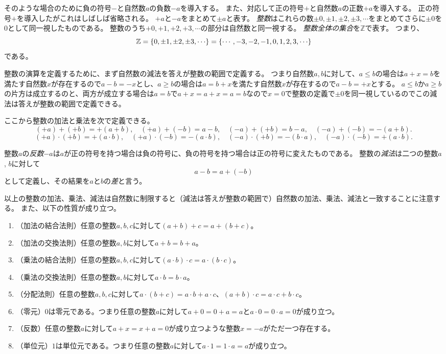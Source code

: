 そのような場合のために負の符号$-$と自然数$a$の負数$-a$を導入する。
また、対応して正の符号$+$と自然数$a$の正数$+a$を導入する。
正の符号$+$を導入したがこれはしばしば省略される。
$+a$と$-a$をまとめて$\pm a$と表す。
\emph{整数}はこれらの数$\pm 0, \pm 1, \pm 2, \pm 3, \cdots$をまとめてさらに$\pm 0$を$0$として同一視したものである。
整数のうち$+0, +1, +2, +3, \cdots$の部分は自然数と同一視する。
\emph{整数全体の集合}を$\mathbb{Z}$で表す。
つまり、
$$
\mathbb{Z} = \lrset{ 0, \pm 1, \pm 2, \pm 3, \cdots } = \lrset{ \cdots, -3, -2, -1, 0, 1, 2, 3, \cdots }
$$
である。

整数の演算を定義するために、まず自然数の減法を答えが整数の範囲で定義する。
つまり自然数$a, b$に対して、$a \le b$の場合は$a+x = b$を満たす自然数$x$が存在するので$a-b = -x$とし、$a \ge b$の場合は$a = b+x$を満たす自然数$x$が存在するので$a-b = +x$とする。
$a \le b$か$a \ge b$の片方は成立するのと、両方が成立する場合は$a = b$で$a+x = a+x = a = b$なので$x = 0$で整数の定義で$\pm 0$を同一視しているのでこの減法は答えが整数の範囲で定義できる。

ここから整数の加法と乗法を次で定義できる。
$$
(+a)+(+b) = +(a+b),
\quad (+a)+(-b) = a-b,
\quad (-a)+(+b) = b-a,
\quad (-a)+(-b) = -(a+b).
$$
$$
(+a)\cdot (+b) = +(a\cdot b),
\quad (+a)\cdot (-b) = -(a\cdot b),
\quad (-a)\cdot (+b) = -(b\cdot a),
\quad (-a)\cdot (-b) = +(a\cdot b).
$$

整数$a$の\emph{反数}$-a$は$a$が正の符号を持つ場合は負の符号に、負の符号を持つ場合は正の符号に変えたものである。
整数の\emph{減法}は二つの整数$a$, $b$に対して
$$
a-b = a+(-b)
$$
として定義し、その結果を$a$と$b$の\emph{差}と言う。

以上の整数の加法、乗法、減法は自然数に制限すると（減法は答えが整数の範囲で）自然数の加法、乗法、減法と一致することに注意する。
また、以下の性質が成り立つ。
\begin{enumerate}
\item
（加法の結合法則）任意の整数$a, b, c$に対して$(a+b)+c = a+(b+c)$。
\item
（加法の交換法則）任意の整数$a, b$に対して$a+b = b+a$。
\item
（乗法の結合法則）任意の整数$a, b, c$に対して$(a\cdot b)\cdot c = a\cdot (b\cdot c)$。
\item
（乗法の交換法則）任意の整数$a, b$に対して$a\cdot b = b\cdot a$。
\item
（分配法則）任意の整数$a, b, c$に対して$a\cdot (b+c) = a\cdot b+a\cdot c$、$(a+b)\cdot c = a\cdot c+b\cdot c$。
\item
（零元）$0$は零元である。つまり任意の整数$a$に対して$a+0 = 0+a = a$と$a\cdot 0 = 0\cdot a = 0$が成り立つ。
\item
（反数）任意の整数$a$に対して$a+x = x+a = 0$が成り立つような整数$x = -a$がただ一つ存在する。
\item
（単位元）$1$は単位元である。つまり任意の整数$a$に対して$a\cdot 1 = 1\cdot a = a$が成り立つ。
\end{enumerate}

